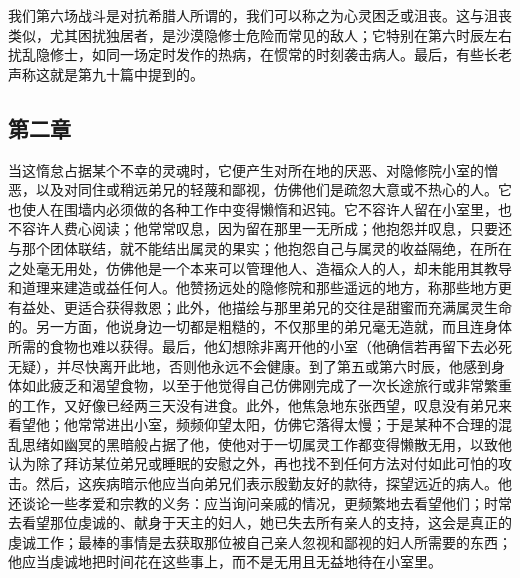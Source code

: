 \par

我们第六场战斗是对抗希腊人所谓的，我们可以称之为心灵困乏或沮丧。这与沮丧类似，尤其困扰独居者，是沙漠隐修士危险而常见的敌人；它特别在第六时辰左右扰乱隐修士，如同一场定时发作的热病，在惯常的时刻袭击病人。最后，有些长老声称这就是第九十篇中提到的。\par


\subsection{第二章}

\par

当这惰怠占据某个不幸的灵魂时，它便产生对所在地的厌恶、对隐修院小室的憎恶，以及对同住或稍远弟兄的轻蔑和鄙视，仿佛他们是疏忽大意或不热心的人。它也使人在围墙内必须做的各种工作中变得懒惰和迟钝。它不容许人留在小室里，也不容许人费心阅读；他常常叹息，因为留在那里一无所成；他抱怨并叹息，只要还与那个团体联结，就不能结出属灵的果实；他抱怨自己与属灵的收益隔绝，在所在之处毫无用处，仿佛他是一个本来可以管理他人、造福众人的人，却未能用其教导和道理来建造或益任何人。他赞扬远处的隐修院和那些遥远的地方，称那些地方更有益处、更适合获得救恩；此外，他描绘与那里弟兄的交往是甜蜜而充满属灵生命的。另一方面，他说身边一切都是粗糙的，不仅那里的弟兄毫无造就，而且连身体所需的食物也难以获得。最后，他幻想除非离开他的小室（他确信若再留下去必死无疑），并尽快离开此地，否则他永远不会健康。到了第五或第六时辰，他感到身体如此疲乏和渴望食物，以至于他觉得自己仿佛刚完成了一次长途旅行或非常繁重的工作，又好像已经两三天没有进食。此外，他焦急地东张西望，叹息没有弟兄来看望他；他常常进出小室，频频仰望太阳，仿佛它落得太慢；于是某种不合理的混乱思绪如幽冥的黑暗般占据了他，使他对于一切属灵工作都变得懒散无用，以致他认为除了拜访某位弟兄或睡眠的安慰之外，再也找不到任何方法对付如此可怕的攻击。然后，这疾病暗示他应当向弟兄们表示殷勤友好的款待，探望远近的病人。他还谈论一些孝爱和宗教的义务：应当询问亲戚的情况，更频繁地去看望他们；时常去看望那位虔诚的、献身于天主的妇人，她已失去所有亲人的支持，这会是真正的虔诚工作；最棒的事情是去获取那位被自己亲人忽视和鄙视的妇人所需要的东西；他应当虔诚地把时间花在这些事上，而不是无用且无益地待在小室里。\par

